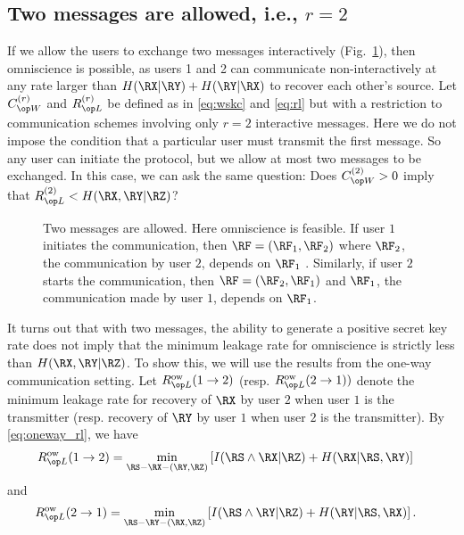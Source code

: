 
\subsection{Two messages are allowed, i.e., $r=2$ }
If we allow the users to exchange two messages interactively (Fig.~\ref{fig:twoway}), then omniscience is possible, as users 1 and 2 can communicate non-interactively at any rate larger than $H(\RX|\RY)+H(\RY|\RX)$ to recover each other's source. Let $\wskc^{(r)}$ and $\rl^{(r)}$ be defined as in \eqref{eq:wskc} and \eqref{eq:rl} but with a restriction to communication schemes involving only  $r=2$ interactive messages. Here we do not impose the condition that a particular user must transmit the first message. So any user can initiate the protocol, but we allow at most two messages to be exchanged. In this case, we can ask the same question: Does $\wskc^{(2)}>0$ imply that $\rl^{(2)}< H(\RX, \RY|\RZ)\/$? 

 \begin{figure}[h]
\centering
\resizebox{0.9\width}{!}{}
\caption{Two messages are allowed. Here omniscience is feasible. If user $1$ initiates the communication, then $\RF=(\RF_1, \RF_2)$ where $\RF_2$, the communication by user $2$, depends on $\RF_1$ . Similarly, if user $2$ starts the communication, then $\RF=(\RF_2, \RF_1)$ and $\RF_1$, the communication made by user $1$, depends on $\RF_1$.}
\label{fig:twoway}
 \end{figure}
 
It turns out that with two messages, the ability to generate a positive secret key rate does not imply that the minimum leakage rate for omniscience is  strictly  less than $H(\RX, \RY | \RZ)$. To show this, we will use the results from the one-way communication setting. Let $\rl^{\text{ow}}(1 \rightarrow 2)$ (resp. $\rl^{\text{ow}}(2 \rightarrow 1))$  denote the minimum leakage rate for recovery of $\RX$ by user $2$ when user $1$ is the transmitter (resp. recovery of $\RY$ by user $1$ when user $2$ is the transmitter). By \eqref{eq:oneway_rl}, we have 
\begin{align*}
    \rl^{\text{ow}} (1 \rightarrow 2) &= \min\limits_{\RS-\RX-(\RY, \RZ)}\left[I(\RS \wedge \RX | \RZ)+H(\RX | \RS, \RY)\right]
\end{align*}
and 
\begin{align*}
    \rl^{\text{ow}} (2 \rightarrow 1) &= \min\limits_{\RS-\RY-(\RX, \RZ)}\left[I(\RS \wedge \RY | \RZ)+H(\RY | \RS, \RX)\right].
\end{align*}


